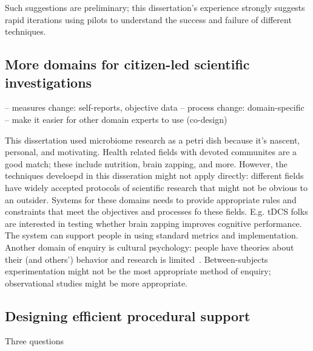 Such suggestions are preliminary; this dissertation's experience strongly suggests rapid iterations using pilots to understand the success and failure of different techniques. 

\subsection{More domains for citizen-led scientific investigations}
-- measures change: self-reports, objective data 
-- process change: domain-specific
-- make it easier for other domain experts to use (co-design)

This dissertation used microbiome research as a petri dish because it’s nascent, personal, and motivating. Health related fields with devoted communites are a good match; these include nutrition, brain zapping, and more. However, the techniques develoepd in this disseration might not apply directly: different fields have widely accepted protocols of scientific research that might not be obvious to an outsider. Systems for these domains needs to provide appropriate rules and constraints that meet the objectives and processes fo these fields. E.g. tDCS folks are interested in testing whether brain zapping improves cognitive performance. The system can support people in using standard metrics and implementation. Another domain of enquiry is cultural psychology: people have theories about their (and others') behavior and research is limited~\cite{Henrich2010a}. Between-subjects experimentation might not be the most appropriate method of enquiry; observational studies might be more appropriate.

\subsection{Designing efficient procedural support}
Three questions

